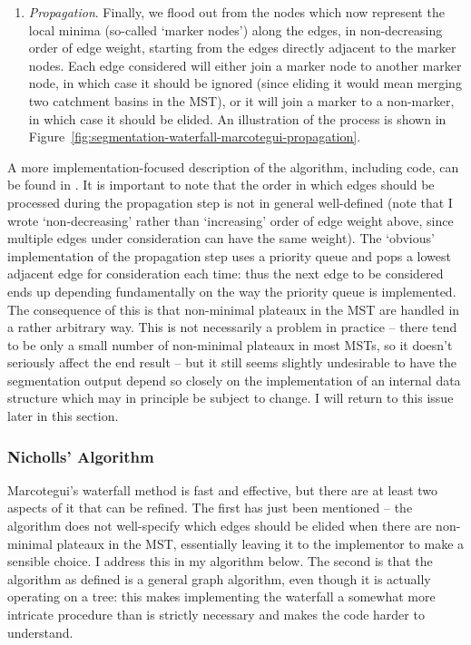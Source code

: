 \begin{enumerate}
\item \emph{Propagation}. Finally, we flood out from the nodes which now represent the local minima (so-called `marker nodes') along the edges, in non-decreasing order of edge weight, starting from the edges directly adjacent to the marker nodes. Each edge considered will either join a marker node to another marker node, in which case it should be ignored (since eliding it would mean merging two catchment basins in the MST), or it will join a marker to a non-marker, in which case it should be elided. An illustration of the process is shown in Figure~\ref{fig:segmentation-waterfall-marcotegui-propagation}.

\end{enumerate}

\noindent A more implementation-focused description of the algorithm, including code, can be found in \cite{golodetz08}. It is important to note that the order in which edges should be processed during the propagation step is not in general well-defined (note that I wrote `non-decreasing' rather than `increasing' order of edge weight above, since multiple edges under consideration can have the same weight). The `obvious' implementation of the propagation step uses a priority queue and pops a lowest adjacent edge for consideration each time: thus the next edge to be considered ends up depending fundamentally on the way the priority queue is implemented. The consequence of this is that non-minimal plateaux in the MST are handled in a rather arbitrary way. This is not necessarily a problem in practice -- there tend to be only a small number of non-minimal plateaux in most MSTs, so it doesn't seriously affect the end result -- but it still seems slightly undesirable to have the segmentation output depend so closely on the implementation of an internal data structure which may in principle be subject to change. I will return to this issue later in this section.


\subsubsection{Nicholls' Algorithm}


Marcotegui's waterfall method is fast and effective, but there are at least two aspects of it that can be refined. The first has just been mentioned -- the algorithm does not well-specify which edges should be elided when there are non-minimal plateaux in the MST, essentially leaving it to the implementor to make a sensible choice. I address this in my algorithm below. The second is that the algorithm as defined is a general graph algorithm, even though it is actually operating on a tree: this makes implementing the waterfall a somewhat more intricate procedure than is strictly necessary and makes the code harder to understand.


